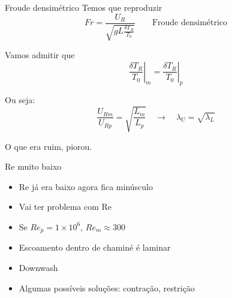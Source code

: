\documentclass{beamer}
\newcommand{\lra}{\ensuremath{\longrightarrow}}
\newcommand{\qrq}{\ensuremath{\quad\lra\quad}}
\begin{document}
\begin{frame}{Froude densimétrico}
  Temos que reproduzir
  \[
  Fr = \frac{U_R}{\sqrt{g L \frac{\delta T_R}{T_0}}} \qquad \text{Froude densimétrico}
  \]

  Vamos admitir que
  \[
  \left.\frac{\delta T_R}{T_0}\right|_m =   \left.\frac{\delta T_R}{T_0}\right|_p
  \]

  Ou seja:
  \[
  \frac{U_{Rm}}{U_{Rp}} = \sqrt{ \frac{L_m}{L_p} } \qrq \lambda_U = \sqrt{\lambda_L}
  \]

  
  O que era ruim, piorou.
\end{frame}

\begin{frame}{Re muito baixo}
  \begin{itemize}
    \item Re já era baixo agora fica minúsculo
    \item Vai ter problema com Re
    \item Se $Re_p = 1\times 10^6$, $Re_m \approx 300$
    \item Escoamento dentro de chaminé é laminar
    \item Downwash
    \item Algumas possíveis soluções: contração, restrição
\end{itemize}
  
\end{frame}
\end{document}
